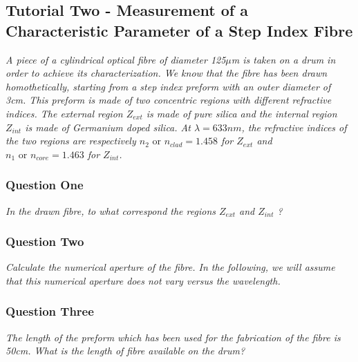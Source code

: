\documentclass[colorlinks,11pt,a4paper,normalphoto,withhyper,ragged2e]{altareport}
\begin{document}
\newpage




\subsection{Tutorial Two - Measurement of a Characteristic Parameter of a Step Index Fibre}
\textit{A piece of a cylindrical optical fibre of diameter 125$\mu$m is taken on a drum in order to achieve its characterization. We know that the fibre has been drawn homothetically, starting from a step index preform with an outer diameter of 3cm. This preform is made of two concentric regions with different refractive indices. The external region $Z_{ext}$ is made of pure silica and the internal region $Z_{int}$ is made of Germanium doped silica. At $\lambda = 633nm$, the refractive indices of the two regions are respectively $n_2 \text{ or } n_{clad} = 1.458$ for $Z_{ext}$ and $n_1 \text{ or } n_{core} = 1.463$ for $Z_{int}$.} \linebreak


\subsubsection{Question One}
\textit{In the drawn fibre, to what correspond the regions $Z_{ext}$ and $Z_{int}$ ?} \linebreak




\subsubsection{Question Two}
\textit{Calculate the numerical aperture of the fibre. In the following, we will assume that this numerical aperture does not vary versus the wavelength.} \linebreak




\subsubsection{Question Three}
\textit{The length of the preform which has been used for the fabrication of the fibre is 50cm. What is the length of fibre available on the drum?} \linebreak




\newpage
\end{document}
